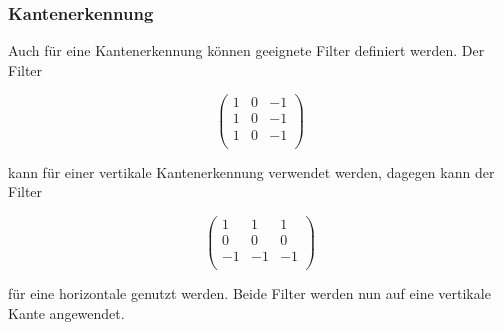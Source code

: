 \subsubsection{Kantenerkennung}

Auch für eine Kantenerkennung können geeignete Filter definiert werden. Der Filter


$$\left(
\begin{array}{ccc}
    1 & 0 & -1 \\
    1 & 0 & -1 \\
    1 & 0 & -1 \\
\end{array}
\right)
$$

kann für einer vertikale Kantenerkennung verwendet werden, dagegen kann der Filter 


$$\left(
\begin{array}{ccc}
    1 &  1 &  1 \\
    0 &  0 &  0 \\
    -1 & -1 & -1 \\
\end{array}
\right)
$$

für eine horizontale genutzt werden. Beide Filter werden nun auf eine vertikale Kante angewendet.


